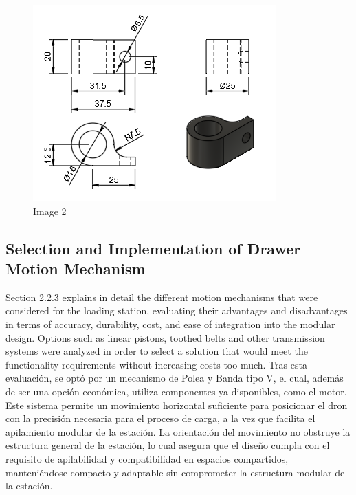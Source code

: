 \begin{figure}[h]
\begin{minipage}{0.45\textwidth}
            \includegraphics[width=\textwidth]{pictures/PLANO_SENSOR.png}
            \caption{Image 2}
            \label{fig:imagen2}
        \end{minipage}%
        \hfill
    \end{figure}

\subsection{Selection and Implementation of Drawer Motion Mechanism}

Section 2.2.3 explains in detail the different motion mechanisms that were considered for the loading station, evaluating their advantages and disadvantages in terms of accuracy, durability, cost, and ease of integration into the modular design. Options such as linear pistons, toothed belts and other transmission systems were analyzed in order to select a solution that would meet the functionality requirements without increasing costs too much. Tras esta evaluación, se optó por un mecanismo de Polea y Banda tipo V, el cual, además de ser una opción económica, utiliza componentes ya disponibles, como el motor. Este sistema permite un movimiento horizontal suficiente para posicionar el dron con la precisión necesaria para el proceso de carga, a la vez que facilita el apilamiento modular de la estación. La orientación del movimiento no obstruye la estructura general de la estación, lo cual asegura que el diseño cumpla con el requisito de apilabilidad y compatibilidad en espacios compartidos, manteniéndose compacto y adaptable sin comprometer la estructura modular de la estación.

